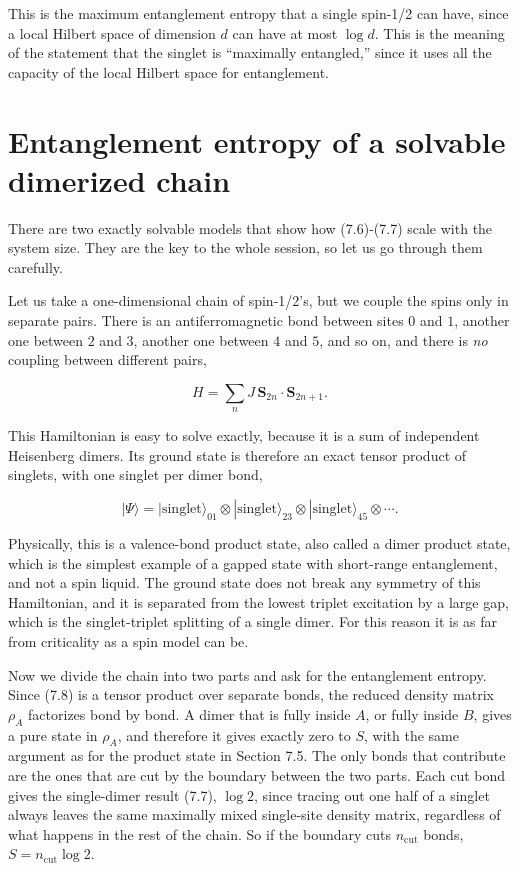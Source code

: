 This is the maximum entanglement entropy that a single spin-1/2 can have, since a local Hilbert space
of dimension $d$ can have at most $\log d$. This is the meaning of the statement that the singlet is
``maximally entangled,'' since it uses all the capacity of the local Hilbert space for entanglement.

\section{Entanglement entropy of a solvable dimerized chain}

There are two exactly solvable models that show how (7.6)-(7.7) scale with the system size. They are
the key to the whole session, so let us go through them carefully.

Let us take a one-dimensional chain of spin-1/2's, but we couple the spins only in separate pairs. There
is an antiferromagnetic bond between sites $0$ and $1$, another one between $2$ and $3$, another one
between $4$ and $5$, and so on, and there is \emph{no} coupling between different pairs,

\begin{equation*}
H = \sum_n J\,\mathbf{S}_{2n}\cdot\mathbf{S}_{2n+1}.
\end{equation*}

This Hamiltonian is easy to solve exactly, because it is a sum of independent Heisenberg dimers. Its
ground state is therefore an exact tensor product of singlets, with one singlet per dimer bond,

\begin{equation}
|\Psi\rangle = |\text{singlet}\rangle_{01} \otimes |\text{singlet}\rangle_{23} \otimes
|\text{singlet}\rangle_{45} \otimes \cdots.
\end{equation}

Physically, this is a valence-bond product state, also called a dimer product state, which is the
simplest example of a gapped state with short-range entanglement, and not a spin liquid. The ground
state does not break any symmetry of this Hamiltonian, and it is separated from the lowest triplet excitation by a large gap, which is the
singlet-triplet splitting of a single dimer. For this reason it is as far from criticality as a spin
model can be.

Now we divide the chain into two parts and ask for the entanglement entropy. Since (7.8) is a tensor
product over separate bonds, the reduced density matrix $\rho_A$ factorizes bond by bond. A dimer that
is fully inside $A$, or fully inside $B$, gives a pure state in $\rho_A$, and therefore it gives
exactly zero to $S$, with the same argument as for the product state in Section 7.5. The only bonds
that contribute are the ones that are cut by the boundary between the two parts. Each cut bond gives
the single-dimer result (7.7), $\log 2$, since tracing out one half of a singlet always leaves the same
maximally mixed single-site density matrix, regardless of what happens in the rest of the chain. So if
the boundary cuts $n_\text{cut}$ bonds, $S = n_\text{cut} \log 2$.

